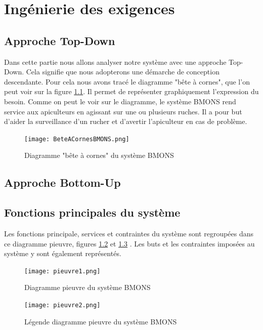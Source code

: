 \chapter{Ingénierie des exigences}
\section{Approche Top-Down}

Dans cette partie nous allons analyser notre système avec une approche Top-Down. Cela signifie que nous adopterons une démarche de conception descendante. Pour cela nous avons tracé le diagramme "bête à cornes", que l'on peut voir sur la figure \ref{fig:beteacorne}. Il permet de représenter graphiquement l'expression du besoin. Comme on peut le voir sur le diagramme, le système BMONS rend service aux apiculteurs en agissant sur une ou plusieurs ruches. Il a pour but d'aider la surveillance d'un rucher et d'avertir l'apiculteur en cas de problème.


\begin{figure}[h!]
\centering\texttt{[image: BeteACornesBMONS.png]}
\caption{\label{fig:beteacorne} Diagramme "bête à cornes" du système BMONS}
\end{figure}

\clearpage

\section{Approche Bottom-Up}

\section{Fonctions principales du système}

Les fonctions principale, services et contraintes du système sont regroupées dans ce diagramme pieuvre, figures \ref{fig:diagpieuvre1} et \ref{fig:diagpieuvre2} . Les buts et les contraintes imposées au système y sont également représentés. 
 
\begin{figure}[h!]
\centering\texttt{[image: pieuvre1.png]}
\caption{\label{fig:diagpieuvre1} Diagramme pieuvre du système BMONS}
\end{figure}

\begin{figure}[h!]
\centering\texttt{[image: pieuvre2.png]}
\caption{\label{fig:diagpieuvre2} Légende diagramme pieuvre du système BMONS}
\end{figure}

